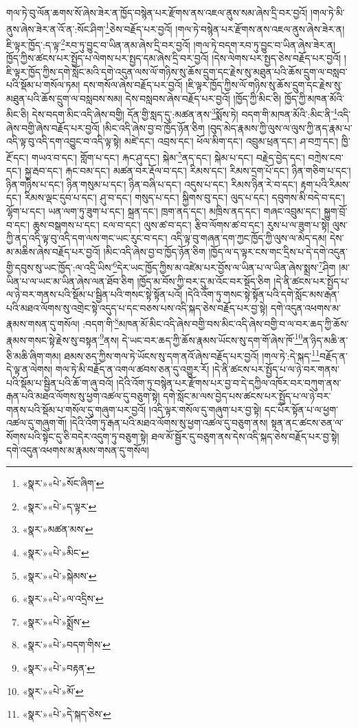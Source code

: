 གལ་ཏེ་བུ་ལོན་ཆགས་སོ་ཞེས་ཟེར་ན་ཁྱོད་བསྙེན་པར་རྫོགས་ནས་འཇལ་ནུས་སམ་ཞེས་དྲི་བར་བྱའོ། །གལ་ཏེ་མི་ནུས་ཞེས་ཟེར་ན་འོ་ན་:སོང་ཤིག་\footnote{«སྣར་»«པེ་»སོང་ཞིག་}ཅེས་བརྗོད་པར་བྱའོ། །གལ་ཏེ་བསྙེན་པར་རྫོགས་ནས་འཇལ་ནུས་ཞེས་ཟེར་ན། ཇི་ལྟར་ཁྱོད་:ད་ལྟ་\footnote{«སྣར་»«པེ་»ད་ལྟར་}རབ་ཏུ་བྱུང་བ་ཡིན་ནམ་ཞེས་དྲི་བར་བྱའོ། །གལ་ཏེ་བདག་རབ་ཏུ་བྱུང་བ་ཡིན་ཞེས་ཟེར་ན། ཁྱོད་ཀྱིས་ཚངས་པར་སྤྱོད་པ་ལེགས་པར་སྤྱད་དམ་ཞེས་དྲི་བར་བྱའོ། །དེས་ལེགས་པར་སྤྱད་ཅེས་བརྗོད་པར་བྱའོ། །ཇི་ལྟར་ཁྱོད་ཀྱིས་དགེ་སློང་མའི་དགེ་འདུན་ལས་ལོ་གཉིས་སུ་ཆོས་དྲུག་དང་རྗེས་སུ་མཐུན་པའི་ཆོས་དྲུག་ལ་བསླབ་པའི་སྡོམ་པ་གསོལ་ཏམ། དས་གསོལ་ཞེས་བརྗོད་པར་བྱའོ། །ཇི་ལྟར་ཁྱོད་ཀྱིས་ལོ་གཉིས་སུ་ཆོས་དྲུག་དང་རྗེས་སུ་མཐུན་པའི་ཆོས་དྲུག་ལ་བསླབས་སམ། དེས་བསླབས་ཞེས་བརྗོད་པར་བྱའོ། །ཁྱོད་ཀྱི་མིང་ཅི། ཁྱོད་ཀྱི་མཁན་མོའི་མིང་ཅི། དེས་བདག་མིང་འདི་ཞེས་བགྱི། དོན་གྱི་སླད་དུ་:མཚན་ནས་\footnote{«སྣར་»མཚན་མས་}སྨོས་ཏེ། བདག་གི་མཁན་མོའི་:མིང་ནི་\footnote{«སྣར་»«པེ་»མིང་}འདི་ཞེས་བགྱི་ཞེས་བརྗོད་པར་བྱའོ། །མིང་འདི་ཞེས་བྱ་བ་ཁྱོད་ཉོན་ཅིག །བུད་མེད་རྣམས་ཀྱི་ལུས་ལ་ལུས་ཀྱི་ནད་རྣམ་པ་འདི་ལྟ་བུ་འདི་དག་འབྱུང་བ་འདི་ལྟ་སྟེ། མཛེ་དང་། འབྲས་དང་། ཕོལ་མིག་དང་། འབྲུམ་ཕྲན་དང་། ཤ་བཀྲ་དང་། ཁྱི་རྔོ་དང་། གཡའ་བ་དང་། གློག་པ་དང་། རྐང་ཤུ་དང་། སྐེམ་\footnote{«སྣར་»«པེ་»སྐེམས་}ནད་དང་། སྐེམ་པ་དང་། བརྗེད་བྱེད་དང་། བཀྲེས་ངབ་དང་། སྐྱ་རྦབ་དང་། རྐང་བམ་དང་། མཚན་བར་རྡོལ་བ་དང་། རིམས་དང་། རིམས་དྲག་པོ་དང་། ཉིན་གཅིག་པ་དང་། ཉིན་གཉིས་པ་དང་། ཉིན་གསུམ་པ་དང་། ཉིན་བཞི་པ་དང་། འདུས་པ་དང་། རིམས་ཉིན་རེ་བ་དང་། རྟག་པའི་རིམས་དང་། རིམས་ལྡང་དུབ་པ་དང་། ཤུ་བ་དང་། གསུད་པ་དང་། སྐྱིགས་བུ་དང་། ལུད་པ་དང་། དབུགས་མི་བདེ་བ་དང་། ལྷོག་པ་དང་། ཡན་ལག་ཏུ་ཟུག་པ་དང་། སྐྲན་དང་། ཁྲག་ནད་དང་། མཁྲིས་ནད་དང་། གཞང་འབྲུམ་དང་། སྐྱུག་བྲོ་བ་དང་། ཆུས་བསྒགས་པ་དང་། ངལ་བ་དང་། ལུས་ཚ་བ་དང་། རྩིབ་ལོགས་ཚ་བ་དང་། རུས་པ་ལ་ཟུག་པ་སྟེ། ལུས་ཀྱི་ནད་འདི་ལྟ་བུ་འདི་དག་ལས་གང་ཡང་རུང་བ་དང་། འདི་ལྟ་བུ་གཞན་དག་ཀྱང་ཁྱོད་ཀྱི་ལུས་ལ་མེད་དམ། དེས་མ་མཆིས་ཞེས་བརྗོད་པར་བྱའོ། །མིང་འདི་ཞེས་བྱ་བ་ཁྱོད་ཉོན་ཅིག །ཁྱོད་ལ་ད་ལྟར་ངས་གང་དྲིས་པ་དེ་དགེ་འདུན་གྱི་དབུས་སུ་ཡང་ཁྱོད་:ལ་འདྲི་ཡིས་\footnote{«སྣར་»«པེ་»ལ་འདྲིས་}དེར་ཡང་ཁྱོད་ཀྱིས་མ་འཛེམ་པར་བྱོས་ལ་ཡིན་པ་ལ་ཡིན་ཞེས་སྨྲས་\footnote{«སྣར་»«པེ་»སྨྲོས་}ཤིག །མ་ཡིན་པ་ལ་ཡང་མ་ཡིན་ཞེས་ལན་ཐོབ་ཅིག །ཁྱོད་མ་བོས་ཀྱི་བར་དུ་མ་འོང་བར་སྡོད་ཅིག །དེ་ནི་ཚངས་པར་སྤྱོད་པ་ལ་ཉེ་བར་གནས་པའི་སྡོམ་པ་སྦྱིན་པའི་གསང་སྟེ་སྟོན་པའོ། །དེའི་འོག་ཏུ་གསང་སྟེ་སྟོན་པའི་དགེ་སློང་མས་རྒན་པའི་མཐའ་ལོགས་སུ་འགྲེང་སྟེ་འདུད་པ་དང་བཅས་པས་འདི་སྐད་ཅེས་བརྗོད་པར་བྱ་སྟེ། དགེ་འདུན་འཕགས་མ་རྣམས་གསན་དུ་གསོལ། :བདག་གི་\footnote{«སྣར་»«པེ་»བདག་གིས་}མཁན་མོ་མིང་འདི་ཞེས་བགྱི་བས་མིང་འདི་ཞེས་བགྱི་བ་ལ་བར་ཆད་ཀྱི་ཆོས་རྣམས་གསང་སྟེ་རྗེས་སུ་བསྟན་\footnote{«སྣར་»«པེ་»བརྟན་}ནས། དེ་ཡང་བར་ཆད་ཀྱི་ཆོས་རྣམས་ཡོངས་སུ་དག་གོ་ཞེས་ཁོ་\footnote{«སྣར་»«པེ་»མོ་}ན་ཉིད་མཆི་ན་ཅི་མཆི་ཞིག་གམ། ཐམས་ཅད་ཀྱིས་གལ་ཏེ་ཡོངས་སུ་དག་ནའོ་ཞེས་བརྗོད་པར་བྱའོ། །གལ་ཏེ་:དེ་སྐད་\footnote{«སྣར་»«པེ་»དེ་སྐད་ཅེས་}བརྗོད་ན་དེ་ལྟ་ན་ལེགས། གལ་ཏེ་མི་བརྗོད་ན་འགལ་ཚབས་ཅན་དུ་འགྱུར་རོ། །དེ་ནི་ཚངས་པར་སྤྱོད་པ་ལ་ཉེ་བར་གནས་པའི་སྡོམ་པ་སྦྱིན་པའི་ཆོ་ག་ཞུ་བའོ། །དེའི་འོག་ཏུ་བསྙེན་པར་རྫོགས་པར་བྱ་བ་དེ་དཀྱིལ་འཁོར་བར་བཀུག་ནས་རྒན་པའི་མཐའ་ལོགས་སུ་ཕྱག་འཚལ་དུ་བཅུག་སྟེ། དགེ་སློང་མ་ལས་བྱེད་པས་ཚངས་པར་སྤྱོད་པ་ལ་ཉེ་བར་གནས་པའི་སྡོམ་པ་གསོལ་དུ་གཞུག་པར་བྱའོ། །འདི་ལྟར་གསོལ་དུ་གཞུག་པར་བྱ་སྟེ། དང་པོར་སྟོན་པ་ལ་ཕྱག་འཚལ་དུ་གཞུག་གོ། །དེའི་འོག་ཏུ་རྒན་པའི་མཐའ་ལོགས་སུ་ཕྱག་འཚལ་དུ་བཅུག་ནས། སྟན་ནང་ཚངས་ཅན་ལ་སོགས་པའི་སྟེང་དུ་ཅི་བདེར་འདུག་ཏུ་བཅུག་སྟེ། ཐལ་མོ་སྦྱོར་དུ་བཅུག་ནས་དེས་འདི་སྐད་ཅེས་བརྗོད་པར་བྱ་སྟེ། དགེ་འདུན་འཕགས་མ་རྣམས་གསན་དུ་གསོལ། 